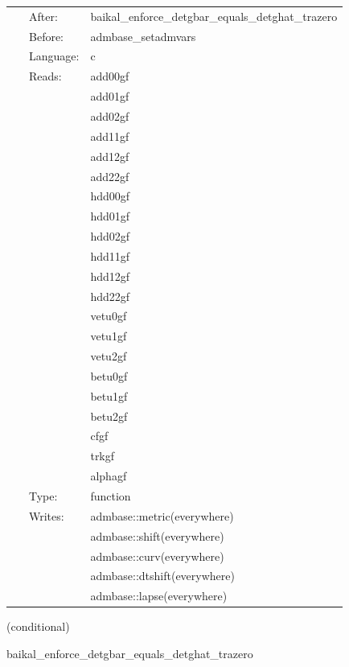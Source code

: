 \hspace{5mm}{\it perform bssn-to-adm conversion. useful for diagnostics. } 


\hspace{5mm}

 \begin{tabular*}{160mm}{cll} 
~ & After:  & baikal\_enforce\_detgbar\_equals\_detghat\_trazero \\ 
~ & Before:  & admbase\_setadmvars \\ 
~ & Language:  & c \\ 
~ & Reads:  & add00gf \\ 
~& ~ &add01gf\\ 
~& ~ &add02gf\\ 
~& ~ &add11gf\\ 
~& ~ &add12gf\\ 
~& ~ &add22gf\\ 
~& ~ &hdd00gf\\ 
~& ~ &hdd01gf\\ 
~& ~ &hdd02gf\\ 
~& ~ &hdd11gf\\ 
~& ~ &hdd12gf\\ 
~& ~ &hdd22gf\\ 
~& ~ &vetu0gf\\ 
~& ~ &vetu1gf\\ 
~& ~ &vetu2gf\\ 
~& ~ &betu0gf\\ 
~& ~ &betu1gf\\ 
~& ~ &betu2gf\\ 
~& ~ &cfgf\\ 
~& ~ &trkgf\\ 
~& ~ &alphagf\\ 
~ & Type:  & function \\ 
~ & Writes:  & admbase::metric(everywhere) \\ 
~& ~ &admbase::shift(everywhere)\\ 
~& ~ &admbase::curv(everywhere)\\ 
~& ~ &admbase::dtshift(everywhere)\\ 
~& ~ &admbase::lapse(everywhere)\\ 
\end{tabular*} 


\vspace{5mm}

   (conditional) 

\hspace{5mm} baikal\_enforce\_detgbar\_equals\_detghat\_trazero 

